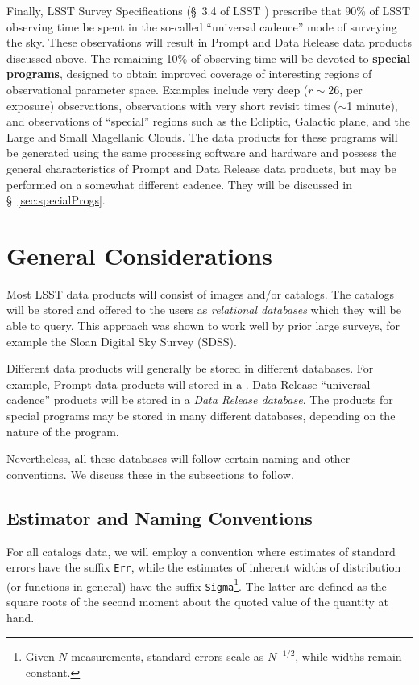\documentclass[SE,lsstdraft,toc]{lsstdoc}
\begin{document}
Finally, LSST Survey Specifications (\S~3.4 of LSST \SRD) prescribe that 90\% of LSST observing time be spent in the so-called ``universal cadence'' mode of surveying the sky. These observations will result in Prompt and Data Release data products discussed above. The remaining 10\% of observing time will be devoted to \textbf{special programs}, designed to obtain improved coverage of interesting regions of observational parameter space. Examples include very deep ($r\sim26$, per exposure) observations, observations with very short revisit times ($\sim$1 minute), and observations of ``special'' regions such as the Ecliptic, Galactic plane, and the Large and Small Magellanic Clouds. The data products for these programs will be generated using the same processing software and hardware and possess the general characteristics of Prompt and Data Release data products, but may be performed on a somewhat different cadence. They will be discussed in \S~\ref{sec:specialProgs}.


\section{General Considerations}

Most LSST data products will consist of images and/or catalogs. The catalogs will be stored and offered to the users as \emph{relational databases} which they will be able to query. This approach was shown to work well by prior large surveys, for example the Sloan Digital Sky Survey (SDSS).

Different data products will generally be stored in different databases. For example, Prompt data products will  stored in a  . Data Release ``universal cadence'' products will be stored in a \emph{Data Release database}. The products for special programs may be stored in many different databases, depending on the nature of the program.

Nevertheless, all these databases will follow certain naming and other conventions. We discuss these in the subsections to follow.

\subsection{Estimator and Naming Conventions}

For all catalogs data, we will employ a convention where estimates of standard errors have the suffix \texttt{Err}, while the estimates of inherent widths of distribution (or functions in general) have the suffix \texttt{Sigma}\footnote{Given $N$ measurements, standard errors scale as $N^{-1/2}$, while widths remain constant.}. The latter are defined as the square roots of the second moment about the quoted value of the quantity at hand.
\end{document}
